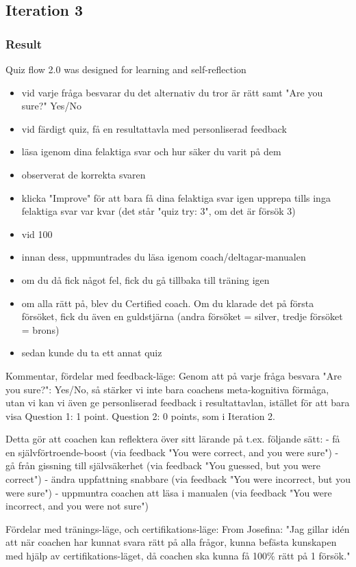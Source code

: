 \subsection{Iteration 3}

  \subsubsection{Result}

  Quiz flow 2.0 was designed for learning and self-reflection

  \begin{itemize}
  \item vid varje fråga besvarar du det alternativ du tror är rätt samt "Are you sure?" Yes/No
  \item vid färdigt quiz, få en resultattavla med personliserad feedback
  \item läsa igenom dina felaktiga svar och hur säker du varit på dem
  \item observerat de korrekta svaren
  \item klicka "Improve" för att bara få dina felaktiga svar igen
  upprepa tills inga felaktiga svar var kvar (det står "quiz try: 3", om det är försök 3)
  \item vid 100%
  \item innan dess, uppmuntrades du läsa igenom coach/deltagar-manualen
  \item om du då fick något fel, fick du gå tillbaka till träning igen
  \item om alla rätt på, blev du Certified coach. Om du klarade det på första försöket, fick du även en guldstjärna (andra försöket = silver, tredje försöket = brons)
  \item sedan kunde du ta ett annat quiz
  \end{itemize}

  Kommentar, fördelar med feedback-läge:
  Genom att på varje fråga besvara "Are you sure?": Yes/No, så stärker vi inte bara coachens meta-kognitiva förmåga, utan vi kan vi även ge personliserad feedback i resultattavlan, istället för att bara visa Question 1: 1 point. Question 2: 0 points, som i Iteration 2.

  Detta gör att coachen kan reflektera över sitt lärande på t.ex. följande sätt:
  - få en självförtroende-boost (via feedback "You were correct, and you were sure")
  - gå från gissning till självsäkerhet (via feedback "You guessed, but you were correct")
  - ändra uppfattning snabbare (via feedback "You were incorrect, but you were sure")
  - uppmuntra coachen att läsa i manualen (via feedback "You were incorrect, and you were not sure")

  Fördelar med tränings-läge, och certifikations-läge:
  From Josefina: "Jag gillar idén att när coachen har kunnat svara rätt på alla frågor, kunna befästa kunskapen med hjälp av certifikations-läget, då coachen ska kunna få 100\% rätt på 1 försök."
